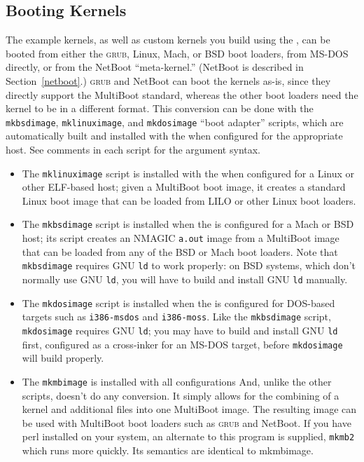 \subsection{Booting Kernels}
\label{booting}

The example kernels,
as well as custom kernels you build using the \oskit,
can be booted from either the \textsc{grub},
Linux, Mach, or BSD boot loaders,
from MS-DOS directly,
or from the NetBoot ``meta-kernel.''
(NetBoot is described in Section~\ref{netboot}.)
\textsc{grub} and NetBoot can boot the kernels as-is,
since they directly support the MultiBoot standard,
whereas the other boot loaders need the kernel to be in a different format.
This conversion can be done
with the \texttt{mkbsdimage}, \texttt{mklinuximage},
and \texttt{mkdosimage} ``boot adapter'' scripts,
which are automatically built and installed with the \oskit{}
when configured for the appropriate host.  See comments in each
script for the argument syntax.
\begin{itemize}
\item	The \texttt{mklinuximage} script is installed with the \oskit{}
	when configured for a Linux or other ELF-based host;
	given a MultiBoot boot image,
	it creates a standard Linux boot image
	that can be loaded from LILO or other Linux boot loaders.
\item	The \texttt{mkbsdimage} script is installed
	when the \oskit{} is configured for a Mach or BSD host;
	its script creates an NMAGIC \texttt{a.out} image from a MultiBoot image
	that can be loaded from any of the BSD or Mach boot loaders.
	Note that \texttt{mkbsdimage} requires GNU \texttt{ld} to work properly:
	on BSD systems, which don't normally use GNU \texttt{ld},
	you will have to build and install GNU \texttt{ld} manually.
\item	The \texttt{mkdosimage} script is installed
	when the \oskit{} is configured for DOS-based targets
	such as \texttt{i386-msdos} and \texttt{i386-moss}.
	Like the \texttt{mkbsdimage} script,
	\texttt{mkdosimage} requires GNU \texttt{ld};
	you may have to build and install GNU \texttt{ld} first,
	configured as a cross-inker for an MS-DOS target,
	before \texttt{mkdosimage} will build properly.
\item   The \texttt{mkmbimage} is installed with all \oskit{} configurations
        And, unlike the other scripts, doesn't do any conversion.
        It simply allows for the combining of a kernel and additional
        files into one MultiBoot image.
        The resulting image can be used with MultiBoot boot loaders
        such as \textsc{grub} and NetBoot.  If you have perl installed
	on your system, an alternate to this program is supplied,
	\texttt{mkmb2} which runs more quickly.  Its semantics are
	identical to mkmbimage.
\end{itemize}
